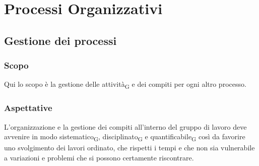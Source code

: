 \section{Processi Organizzativi}
\label{organizzativi}

\subsection{Gestione dei processi}
    \subsubsection{Scopo}
    Qui lo scopo è la gestione delle attività\textsubscript{G} e dei compiti per ogni altro processo.
    \subsubsection{Aspettative}
    L'organizzazione e la gestione dei compiti all'interno del gruppo di lavoro deve avvenire in modo sistematico\textsubscript{G}, disciplinato\textsubscript{G} e quantificabile\textsubscript{G} così da favorire uno svolgimento dei lavori ordinato, che rispetti i tempi e che non sia vulnerabile a variazioni e problemi che si possono certamente riscontrare.
